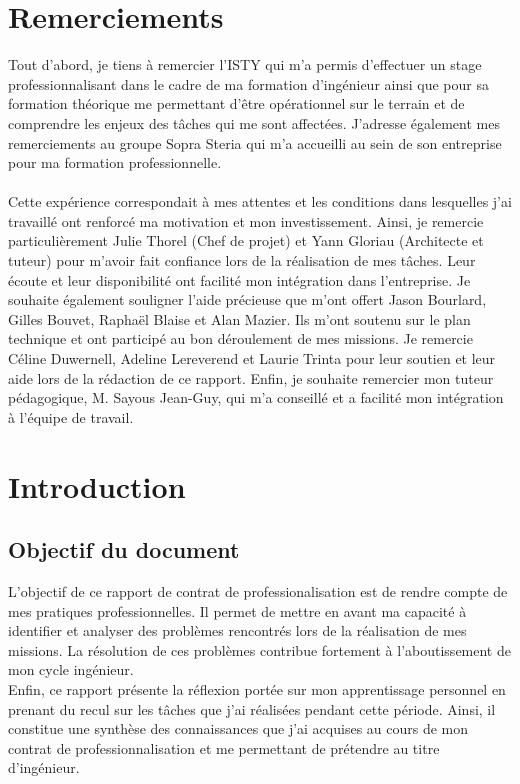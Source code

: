 \documentclass[12pt,a4paper]{article}
\begin{document}
\section{Remerciements}
Tout d'abord, je tiens à remercier l'\gls{ISTY} qui m'a permis d'effectuer un stage professionnalisant dans le cadre de ma formation d'ingénieur ainsi que pour sa formation théorique me permettant d'être opérationnel sur le terrain et de comprendre les enjeux des tâches qui me sont affectées. J'adresse également mes remerciements au groupe Sopra Steria qui m'a accueilli au sein de son entreprise pour ma formation professionnelle.\\\\ Cette expérience correspondait à mes attentes et les conditions dans lesquelles j'ai travaillé ont renforcé ma motivation et  mon investissement. Ainsi, je remercie particulièrement Julie Thorel (Chef de projet) et Yann Gloriau (Architecte et tuteur) pour m'avoir fait confiance lors de la réalisation de mes tâches. Leur écoute et leur disponibilité ont facilité mon intégration dans l'entreprise. Je souhaite également souligner l'aide précieuse que m'ont offert Jason Bourlard, Gilles Bouvet, Raphaël Blaise et Alan Mazier. Ils m'ont soutenu sur le plan technique et ont participé au bon déroulement de mes missions.
\medbreak
Je remercie Céline Duwernell, Adeline Lereverend et Laurie Trinta pour leur soutien et leur aide lors de la rédaction de ce rapport.
\smallbreak
Enfin, je souhaite remercier mon tuteur pédagogique,  M. Sayous Jean-Guy, qui m'a conseillé et a facilité mon intégration à l'équipe de travail. 
\newpage
\section{Introduction}
\subsection{Objectif du document}
L'objectif de ce rapport de contrat de professionalisation est de rendre compte de mes pratiques professionnelles. Il permet de mettre en avant ma capacité à identifier et analyser des problèmes rencontrés lors de la réalisation de mes missions. La résolution de ces problèmes contribue fortement à l'aboutissement de mon cycle ingénieur.\\
Enfin, ce rapport présente la réflexion portée sur mon apprentissage personnel en prenant du recul sur les tâches que j'ai réalisées pendant cette période. 
Ainsi, il constitue une synthèse des connaissances que j'ai acquises au cours de mon contrat de professionnalisation et me permettant de prétendre au titre d'ingénieur.
\end{document}
